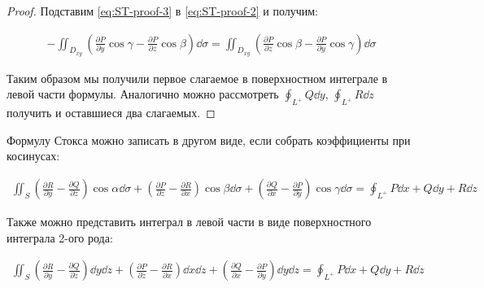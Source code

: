 \begin{proof}
  Подставим \eqref{eq:ST-proof-3} в \eqref{eq:ST-proof-2} и получим:

  \begin{align*}
    -\iint_{D_{xy}} \left(
      \frac{\partial P}{\partial y} \cos \gamma
      - \frac{\partial P}{\partial z} \cos \beta
    \right) \dd \sigma
    =
    \iint_{D_{xy}} \left(
      \frac{\partial P}{\partial z} \cos \beta
      - \frac{\partial P}{\partial y} \cos \gamma
    \right) \dd \sigma
  \end{align*}

  Таким образом мы получили первое слагаемое в поверхностном интеграле в левой
  части формулы. Аналогично можно рассмотреть
  \(\displaystyle \oint_{L^{+}} Q \dd y\),
  \(\displaystyle \oint_{L^{+}} R \dd z\)
  получить и оставшиеся два слагаемых.
\end{proof}

\begin{remark}
  Формулу Стокса можно записать в другом виде, если собрать коэффициенты при
  косинусах:

  \begin{align*}
    \iint_{S}
      \left(
        \frac{\partial R}{\partial y} 
        - \frac{\partial Q}{\partial z}
      \right) \cos \alpha \dd \sigma
      + \left(
        \frac{\partial P}{\partial z} 
        - \frac{\partial R}{\partial x}
      \right) \cos \beta \dd \sigma
      + \left(
        \frac{\partial Q}{\partial x} 
        - \frac{\partial P}{\partial y}
      \right) \cos \gamma \dd \sigma
    = \oint_{L^{+}} P \dd x + Q \dd y + R \dd z
  \end{align*}

  Также можно представить интеграл в левой части в виде поверхностного интеграла
  2-ого рода:

  \begin{align*}
    \iint_{S}
      \left(
        \frac{\partial R}{\partial y} 
        - \frac{\partial Q}{\partial z}
      \right) \dd y \dd z
      + \left(
        \frac{\partial P}{\partial z} 
        - \frac{\partial R}{\partial x}
      \right) \dd x \dd z
      + \left(
        \frac{\partial Q}{\partial x} 
        - \frac{\partial P}{\partial y}
      \right) \dd y \dd z
    = \oint_{L^{+}} P \dd x + Q \dd y + R \dd z
  \end{align*}
\end{remark}
